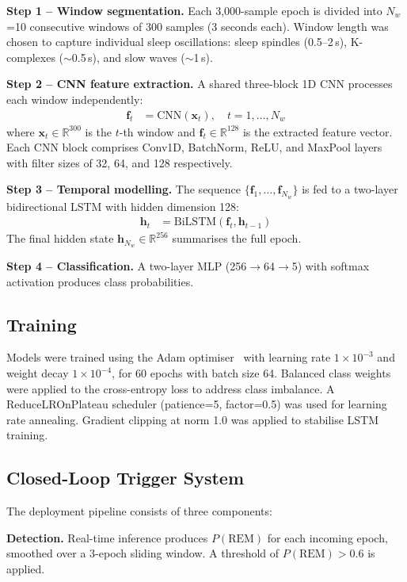 \documentclass[journal]{IEEEtran}
\begin{document}
\textbf{Step 1 -- Window segmentation.}
Each 3,000-sample epoch is divided into $N_w$=10
consecutive windows of 300 samples (3 seconds each).
Window length was chosen to capture individual sleep
oscillations: sleep spindles (0.5--2\,s),
K-complexes ($\sim$0.5\,s), and slow waves ($\sim$1\,s).

\textbf{Step 2 -- CNN feature extraction.}
A shared three-block 1D CNN processes each window
independently:
\begin{align}
\mathbf{f}_t &= \text{CNN}(\mathbf{x}_t),
\quad t = 1,\ldots,N_w
\end{align}
where $\mathbf{x}_t \in \mathbb{R}^{300}$ is the
$t$-th window and $\mathbf{f}_t \in \mathbb{R}^{128}$
is the extracted feature vector.
Each CNN block comprises Conv1D, BatchNorm, ReLU,
and MaxPool layers with filter sizes of 32, 64, and
128 respectively.

\textbf{Step 3 -- Temporal modelling.}
The sequence $\{\mathbf{f}_1, \ldots, \mathbf{f}_{N_w}\}$
is fed to a two-layer bidirectional LSTM with hidden
dimension 128:
\begin{align}
\mathbf{h}_t &= \text{BiLSTM}(\mathbf{f}_t,
\mathbf{h}_{t-1})
\end{align}
The final hidden state
$\mathbf{h}_{N_w} \in \mathbb{R}^{256}$
summarises the full epoch.

\textbf{Step 4 -- Classification.}
A two-layer MLP (256$\rightarrow$64$\rightarrow$5)
with softmax activation produces class probabilities.

\subsection{Training}

Models were trained using the Adam
optimiser~\cite{kingma2014} with learning rate
$1 \times 10^{-3}$ and weight decay
$1 \times 10^{-4}$, for 60 epochs with batch size 64.
Balanced class weights were applied to the
cross-entropy loss to address class imbalance.
A ReduceLROnPlateau scheduler (patience=5, factor=0.5)
was used for learning rate annealing.
Gradient clipping at norm 1.0 was applied to
stabilise LSTM training.

\subsection{Closed-Loop Trigger System}

The deployment pipeline consists of three components:

\textbf{Detection.}
Real-time inference produces $P(\text{REM})$ for each
incoming epoch, smoothed over a 3-epoch sliding window.
A threshold of $P(\text{REM}) > 0.6$ is applied.
\end{document}
